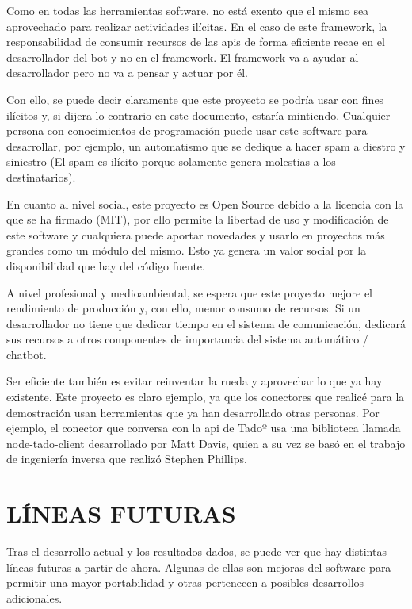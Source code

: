 \documentclass[spanish,12pt, a4paper, twoside]{paper}
\let\oldsection\section
\def\section{\cleardoublepage\oldsection}
\begin{document}
Como en todas las herramientas software, no está exento que el mismo sea aprovechado para realizar actividades ilícitas. En el caso de este framework, la responsabilidad de consumir recursos de las apis de forma eficiente recae en el desarrollador del bot y no en el framework. El framework va a ayudar al desarrollador pero no va a pensar y actuar por él.
\newline

Con ello, se puede decir claramente que este proyecto se podría usar con fines ilícitos y, si dijera lo contrario en este documento, estaría mintiendo. Cualquier persona con conocimientos de programación puede usar este software para desarrollar, por ejemplo, un automatismo que se dedique a hacer spam a diestro y siniestro (El spam es ilícito porque solamente genera molestias a los destinatarios).
\newline

En cuanto al nivel social, este proyecto es Open Source debido a la licencia con la que se ha firmado (MIT), por ello permite la libertad de uso y modificación de este software y cualquiera puede aportar novedades y usarlo en proyectos más grandes como un módulo del mismo. Esto ya genera un valor social por la disponibilidad que hay del código fuente.
\newline

A nivel profesional y medioambiental, se espera que este proyecto mejore el rendimiento de producción y, con ello, menor consumo de recursos. Si un desarrollador no tiene que dedicar tiempo en el sistema de comunicación, dedicará sus recursos a otros componentes de importancia del sistema automático / chatbot.
\newline

Ser eficiente también es evitar reinventar la rueda y aprovechar lo que ya hay existente. Este proyecto es claro ejemplo, ya que los conectores que realicé para la demostración usan herramientas que ya han desarrollado otras personas. Por ejemplo, el conector que conversa con la api de Tadoº usa una biblioteca llamada node-tado-client desarrollado por Matt Davis, quien a su vez se basó en el trabajo de ingeniería inversa que realizó Stephen Phillips.

\section{LÍNEAS FUTURAS}

Tras el desarrollo actual y los resultados dados, se puede ver que hay distintas líneas futuras a partir de ahora. Algunas de ellas son mejoras del software para permitir una mayor portabilidad y otras pertenecen a posibles desarrollos adicionales.
\end{document}
